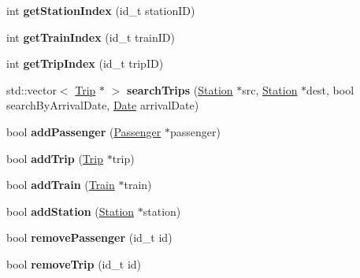 \begin{DoxyCompactItemize}
\item 
\mbox{\label{classSystem_a231710db7f31b3fec68f90fd90b292eb}} 
int {\bfseries get\+Station\+Index} (id\+\_\+t station\+ID)
\item 
\mbox{\label{classSystem_a15d033a2efda45b83bbe0800698ae712}} 
int {\bfseries get\+Train\+Index} (id\+\_\+t train\+ID)
\item 
\mbox{\label{classSystem_aa431fdc152458fc39efb9a60e9f62f01}} 
int {\bfseries get\+Trip\+Index} (id\+\_\+t trip\+ID)
\item 
\mbox{\label{classSystem_a293b247432ab577c9bf0ba7285a6eeda}} 
std\+::vector$<$ \mbox{\hyperlink{classTrip}{Trip}} $\ast$ $>$ {\bfseries search\+Trips} (\mbox{\hyperlink{classStation}{Station}} $\ast$src, \mbox{\hyperlink{classStation}{Station}} $\ast$dest, bool search\+By\+Arrival\+Date, \mbox{\hyperlink{classDate}{Date}} arrival\+Date)
\item 
\mbox{\label{classSystem_a933891c246bf870518f334ea5666b95c}} 
bool {\bfseries add\+Passenger} (\mbox{\hyperlink{classPassenger}{Passenger}} $\ast$passenger)
\item 
\mbox{\label{classSystem_ad019d3f8d30be9b2f57842512f0393ed}} 
bool {\bfseries add\+Trip} (\mbox{\hyperlink{classTrip}{Trip}} $\ast$trip)
\item 
\mbox{\label{classSystem_a8022adc1c1f212c138ca9da7995bb422}} 
bool {\bfseries add\+Train} (\mbox{\hyperlink{classTrain}{Train}} $\ast$train)
\item 
\mbox{\label{classSystem_abc5bda005d56392c66914ddd4f96e725}} 
bool {\bfseries add\+Station} (\mbox{\hyperlink{classStation}{Station}} $\ast$station)
\item 
\mbox{\label{classSystem_af31acdda711986978533367ce3a64276}} 
bool {\bfseries remove\+Passenger} (id\+\_\+t id)
\item 
\mbox{\label{classSystem_ae802cde42ae56b50adc02c76920e9001}} 
bool {\bfseries remove\+Trip} (id\+\_\+t id)
\item 

\end{DoxyCompactItemize}

